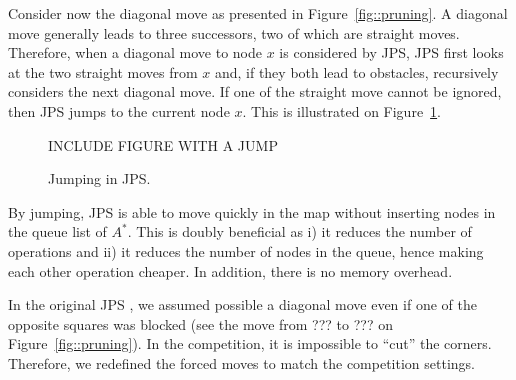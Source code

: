 Consider now the diagonal move as presented in Figure~\ref{fig::pruning}.  
A diagonal move generally leads to three successors, 
two of which are straight moves.  
Therefore, when a diagonal move to node $x$ is considered by JPS, 
JPS first looks at the two straight moves from $x$ 
and, if they both lead to obstacles, recursively considers the next diagonal move.  
If one of the straight move cannot be ignored, 
then JPS jumps to the current node $x$.  
This is illustrated on Figure~\ref{fig::jump}.  

\begin{figure}[ht]
  INCLUDE FIGURE WITH A JUMP
  \caption{Jumping in JPS.}
  \label{fig::jump}
\end{figure}

By jumping, JPS is able to move quickly in the map 
without inserting nodes in the queue list of $A^*$.  
This is doubly beneficial as i) it reduces the number of operations 
and ii) it reduces the number of nodes in the queue, 
hence making each other operation cheaper.  
In addition, there is no memory overhead.  

In the original JPS \cite{harabor11b}, 
we assumed possible a diagonal move
even if one of the opposite squares was blocked 
(see the move from ??? to ??? on Figure~\ref{fig::pruning}).  
In the competition, it is impossible to ``cut'' the corners.  
Therefore, we redefined the forced moves to match the competition settings.  
